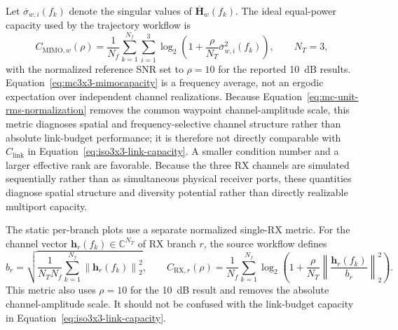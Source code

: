 Let $\overline{\sigma}_{w,i}(f_k)$ denote the singular values of $\overline{\mathbf{H}}_w(f_k)$. The ideal equal-power capacity used by the trajectory workflow is
\begin{equation}
    C_{\mathrm{MIMO},w}(\rho)=\frac{1}{N_f}\sum_{k=1}^{N_f}
    \sum_{i=1}^{3}\log_2\!\left(1+\frac{\rho}{N_T}
    \overline{\sigma}_{w,i}^2(f_k)\right),
    \qquad N_T=3,
    \label{eq:mc3x3-mimocapacity}
\end{equation}
with the normalized reference SNR set to $\rho=10$ for the reported 10~dB results. Equation~\ref{eq:mc3x3-mimocapacity} is a frequency average, not an ergodic expectation over independent channel realizations. Because Equation~\ref{eq:mc-unit-rms-normalization} removes the common waypoint channel-amplitude scale, this metric diagnoses spatial and frequency-selective channel structure rather than absolute link-budget performance; it is therefore not directly comparable with $C_\mathrm{link}$ in Equation~\ref{eq:iso3x3-link-capacity}. A smaller condition number and a larger effective rank are favorable. Because the three RX channels are simulated sequentially rather than as simultaneous physical receiver ports, these quantities diagnose spatial structure and diversity potential rather than directly realizable multiport capacity.

The static per-branch plots use a separate normalized single-RX metric. For the channel vector $\mathbf{h}_r(f_k)\in\mathbb{C}^{N_T}$ of RX branch $r$, the source workflow defines
\begin{equation}
    b_r=\sqrt{\frac{1}{N_T N_f}\sum_{k=1}^{N_f}
    \left\lVert\mathbf{h}_r(f_k)\right\rVert_2^2},
    \qquad
    C_{\mathrm{RX},r}(\rho)=\frac{1}{N_f}\sum_{k=1}^{N_f}
    \log_2\!\left(1+\frac{\rho}{N_T}
    \left\lVert\frac{\mathbf{h}_r(f_k)}{b_r}\right\rVert_2^2\right).
    \label{eq:static-normalized-rx-capacity}
\end{equation}
This metric also uses $\rho=10$ for the 10~dB result and removes the absolute channel-amplitude scale. It should not be confused with the link-budget capacity in Equation~\ref{eq:iso3x3-link-capacity}.

